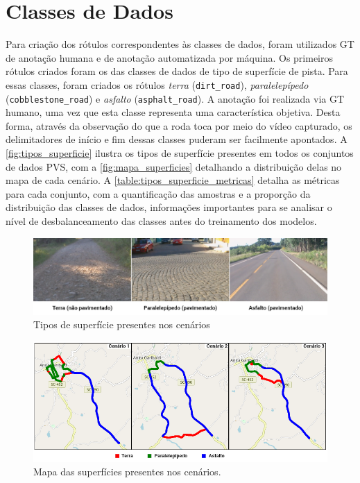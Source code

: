 \section{Classes de Dados}

Para criação dos rótulos correspondentes às classes de dados, foram utilizados GT de anotação humana e de anotação automatizada por máquina. Os primeiros rótulos criados foram os das classes de dados de tipo de superfície de pista. Para essas classes, foram criados os rótulos \emph{terra} (\texttt{dirt\_road}), \emph{paralelepípedo} (\texttt{cobblestone\_road}) e \emph{asfalto} (\texttt{asphalt\_road}). A anotação foi realizada via GT humano, uma vez que esta classe representa uma característica objetiva. Desta forma, através da observação do que a roda toca por meio do vídeo capturado, os delimitadores de início e fim dessas classes puderam ser facilmente apontados. A \autoref{fig:tipos_superficie} ilustra os tipos de superfície presentes em todos os conjuntos de dados PVS, com a \autoref{fig:mapa_superficies} detalhando a distribuição delas no mapa de cada cenário. A \autoref{table:tipos_superficie_metricas} detalha as métricas para cada conjunto, com a quantificação das amostras e a proporção da distribuição das classes de dados, informações importantes para se analisar o nível de desbalanceamento das classes antes do treinamento dos modelos. 

\begin{figure}[H]
  \centering
  \caption{Tipos de superfície presentes nos cenários}
   \label{fig:tipos_superficie}
   \includegraphics[width=1\textwidth]{figuras/fig_23.png}
\end{figure}

\begin{figure}[H]
  \centering
  \caption{Mapa das superfícies presentes nos cenários.}
   \label{fig:mapa_superficies}
   \includegraphics[width=1\textwidth]{figuras/fig_25.png}
\end{figure}

